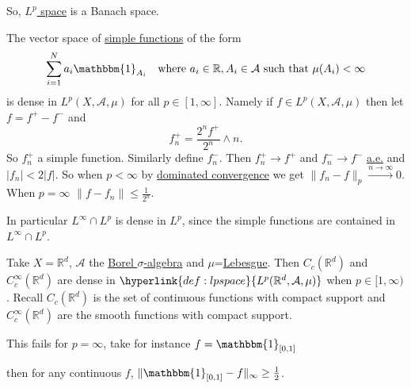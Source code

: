 \documentclass{article}
\newcommand{\1}[1]{\mathbbm{1}_{#1}}
\begin{document}
So, \hyperlink{def:lpspace}{$L^p$ space} is a Banach space.
\begin{remark}
    The vector space of \hyperlink{def:simpleFunc}{simple functions} of the form
    \begin{equation*}
        \sum_{i=1}^N a_i \1{A_i} \quad \text{where } a_i \in \mathbb{R}, A_i \in \mathcal{A} \text{ such that } \mu(A_i) < \infty
    \end{equation*}
    is dense in $L^p(X,\mathcal{A},\mu)$ for all $p \in [1,\infty]$.
    Namely if $f \in L^p(X,\mathcal{A},\mu)$ then let $f = f^+ - f^-$ and
    \begin{equation*}
        f_n^+ = \frac{2^n f^+}{2^n} \wedge n.
    \end{equation*}
    So $f_n^+$ a simple function. Similarly define $f_n^-$.
    Then $f_n^+ \to f^+$ and $f_n^- \to f^-$ \hyperlink{def:ae}{a.e.} and $|f_n| < 2|f|$.
    So when $p < \infty$ by \hyperlink{thm:dct}{dominated convergence} we get $\|f_n-f\|_p \xrightarrow{n \to \infty} 0$.
    When $p=\infty$ $\|f-f_n\|\leq \frac{1}{2^n}$.

    In particular $L^\infty \cap L^p$ is dense in $L^p$, since the simple functions are contained in $L^\infty \cap L^p$.
\end{remark}
\begin{remark}
    Take $X=\mathbb{R}^d$, $\mathcal{A}$ the \hyperlink{def:borelAlg}{Borel $\sigma$-algebra} and $\mu$=\hyperlink{def:lebMeas}{Lebesgue}.
    Then $C_c(\mathbb{R}^d)$ and $C_c^\infty (\mathbb{R}^d)$ are dense in $\hyperlink{def:lpspace}{L^p(\mathbb{R}^d, \mathcal{A},\mu)}$ when $p \in [1, \infty)$.
    Recall $C_c(\mathbb{R}^d)$ is the set of continuous functions with compact support and $C_c^\infty(\mathbb{R}^d)$ are the smooth functions with compact support.

    This fails for $p=\infty$, take for instance $f = \1{[0,1]}$
    \begin{center}
    \end{center}
    then for any continuous $f$, $\|\1{[0,1]}-f\|_\infty \geq \frac 12$.

\end{remark}
\end{document}
